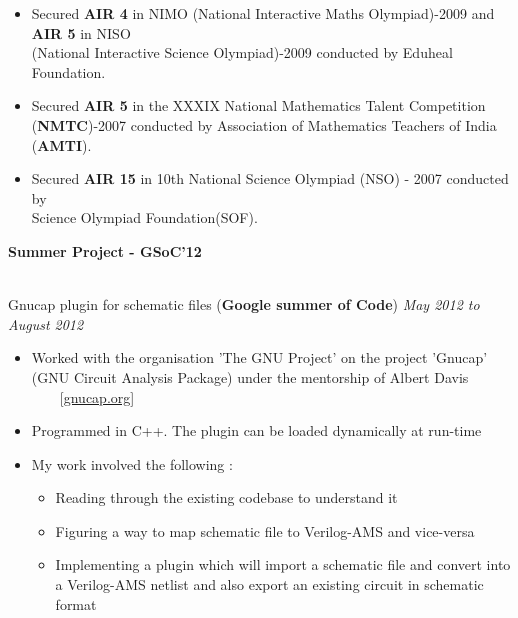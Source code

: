 \documentclass[a4paper,11pt]{article}
\newcommand{\isep}{-2 pt}
\newcommand{\resheading}[1]{{\small \colorbox{mygrey}{\begin{minipage}{0.975\textwidth}{\textbf{#1 \vphantom{p\^{E}}}}\end{minipage}}}}
\begin{document}
\begin{itemize}
   \item Secured \textbf{AIR 4} in NIMO (National Interactive Maths Olympiad)-2009 and \textbf{AIR 5} in NISO\\ (National Interactive Science Olympiad)-2009 conducted by Eduheal Foundation.\\[-0.8cm]
  \item Secured \textbf{AIR 5} in the  XXXIX National Mathematics Talent Competition (\textbf{NMTC})-2007 conducted by Association of Mathematics Teachers of India (\textbf{AMTI}).\\[-0.8cm]
  \item Secured \textbf{AIR 15} in 10th National Science Olympiad (NSO) - 2007 conducted by \\ Science Olympiad Foundation(SOF).
\end{itemize}

\resheading{\textbf{\large Summer Project - GSoC'12}} \\

\hspace{1mm}Gnucap plugin for schematic files (\textbf{Google summer of Code}) \emph{May 2012 to August 2012} \\[-0.6cm]
    \begin{itemize}
        \item Worked with the organisation 'The GNU Project' on the project 'Gnucap' (GNU Circuit Analysis Package) under the mentorship of Albert Davis \ \ \ \  [\url{gnucap.org}] \\[-0.6cm]
        \item Programmed in C++. The plugin can be loaded dynamically at run-time
        \item My work involved the following :
        \begin{itemize} \itemsep \isep
        \item Reading through the existing codebase to understand it 
        \item Figuring a way to map schematic file to Verilog-AMS and vice-versa
        \item Implementing a plugin which will import a schematic file and convert into a Verilog-AMS netlist and also export an existing  circuit in schematic format
        
    \end{itemize}
    \end{itemize}
\end{document}
